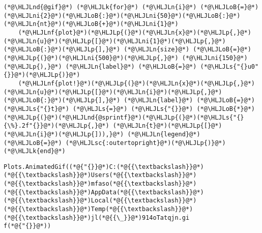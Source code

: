 \documentclass[12pt,a4paper]{article}
\newcommand{\HLJLk}[1]{\textcolor[RGB]{148,91,176}{\textbf{#1}}}
\newcommand{\HLJLn}[1]{#1}
\newcommand{\HLJLnd}[1]{\textcolor[RGB]{214,102,97}{#1}}
\newcommand{\HLJLnf}[1]{\textcolor[RGB]{66,102,213}{#1}}
\newcommand{\HLJLs}[1]{\textcolor[RGB]{201,61,57}{#1}}
\newcommand{\HLJLsc}[1]{\textcolor[RGB]{201,61,57}{#1}}
\newcommand{\HLJLni}[1]{\textcolor[RGB]{59,151,46}{#1}}
\newcommand{\HLJLoB}[1]{\textcolor[RGB]{102,102,102}{\textbf{#1}}}
\newcommand{\HLJLp}[1]{#1}
\begin{document}
\begin{lstlisting}
(*@\HLJLnd{@gif}@*) (*@\HLJLk{for}@*) (*@\HLJLn{i}@*) (*@\HLJLoB{=}@*) (*@\HLJLni{2}@*)(*@\HLJLoB{:}@*)(*@\HLJLni{50}@*)(*@\HLJLoB{:}@*)(*@\HLJLn{nt}@*)(*@\HLJLoB{+}@*)(*@\HLJLni{1}@*) 
    (*@\HLJLnf{plot}@*)(*@\HLJLp{(}@*)(*@\HLJLn{x}@*)(*@\HLJLp{,}@*) (*@\HLJLn{u}@*)(*@\HLJLp{[}@*)(*@\HLJLni{1}@*)(*@\HLJLp{,}@*)(*@\HLJLoB{:}@*)(*@\HLJLp{],}@*) (*@\HLJLn{size}@*) (*@\HLJLoB{=}@*) (*@\HLJLp{(}@*)(*@\HLJLni{500}@*)(*@\HLJLp{,}@*) (*@\HLJLni{150}@*)(*@\HLJLp{),}@*) (*@\HLJLn{label}@*) (*@\HLJLoB{=}@*) (*@\HLJLs{"{}u0"{}}@*)(*@\HLJLp{)}@*)
    (*@\HLJLnf{plot!}@*)(*@\HLJLp{(}@*)(*@\HLJLn{x}@*)(*@\HLJLp{,}@*) (*@\HLJLn{u}@*)(*@\HLJLp{[}@*)(*@\HLJLn{i}@*)(*@\HLJLp{,}@*)(*@\HLJLoB{:}@*)(*@\HLJLp{],}@*) (*@\HLJLn{label}@*) (*@\HLJLoB{=}@*) (*@\HLJLs{"{}t}@*) (*@\HLJLs{=}@*) (*@\HLJLs{"{}}@*) (*@\HLJLoB{*}@*) (*@\HLJLp{(}@*)(*@\HLJLnd{@sprintf}@*)(*@\HLJLp{(}@*)(*@\HLJLs{"{}{\%}.2f"{}}@*)(*@\HLJLp{,}@*) (*@\HLJLn{t}@*)(*@\HLJLp{[}@*)(*@\HLJLn{i}@*)(*@\HLJLp{])),}@*) (*@\HLJLn{legend}@*) (*@\HLJLoB{=}@*) (*@\HLJLsc{:outertopright}@*)(*@\HLJLp{)}@*)
(*@\HLJLk{end}@*)
\end{lstlisting}

\begin{lstlisting}
Plots.AnimatedGif((*@{"{}}@*)C:(*@{{\textbackslash}}@*)(*@{{\textbackslash}}@*)Users(*@{{\textbackslash}}@*)(*@{{\textbackslash}}@*)mfaso(*@{{\textbackslash}}@*)(*@{{\textbackslash}}@*)AppData(*@{{\textbackslash}}@*)(*@{{\textbackslash}}@*)Local(*@{{\textbackslash}}@*)(*@{{\textbackslash}}@*)Temp(*@{{\textbackslash}}@*)(*@{{\textbackslash}}@*)jl(*@{{\_}}@*)914oTatqjn.gi
f(*@{"{}}@*))
\end{lstlisting}
\end{document}
